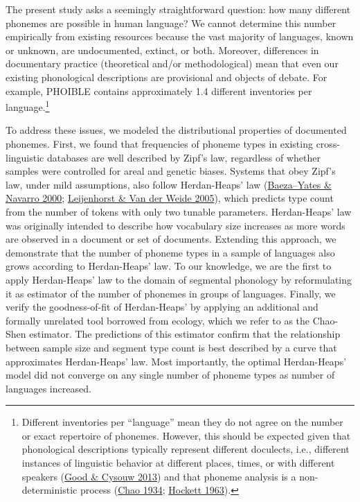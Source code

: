 \documentclass[
]{article}
\begin{document}
The present study asks a seemingly straightforward question: how many
different phonemes are possible in human language? We cannot determine
this number empirically from existing resources because the vast
majority of languages, known or unknown, are undocumented, extinct, or
both. Moreover, differences in documentary practice (theoretical and/or
methodological) mean that even our existing phonological descriptions
are provisional and objects of debate. For example, PHOIBLE contains
approximately 1.4 different inventories per language.\footnote{Different
  inventories per ``language'' mean they do not agree on the number or
  exact repertoire of phonemes. However, this should be expected given
  that phonological descriptions typically represent different
  doculects, i.e., different instances of linguistic behavior at
  different places, times, or with different speakers
  (\protect\hyperlink{ref-GoodCysouw2013}{Good \& Cysouw 2013}) and that
  phoneme analysis is a non-deterministic process
  (\protect\hyperlink{ref-Chao1934}{Chao 1934};
  \protect\hyperlink{ref-Hockett1963}{Hockett 1963}).}

To address these issues, we modeled the distributional properties of
documented phonemes. First, we found that frequencies of phoneme types
in existing cross-linguistic databases are well described by Zipf's law,
regardless of whether samples were controlled for areal and genetic
biases. Systems that obey Zipf's law, under mild assumptions, also
follow Herdan-Heaps' law
(\protect\hyperlink{ref-BaezaNavarro2000}{Baeza--Yates \& Navarro 2000};
\protect\hyperlink{ref-vanLeijenhorst2005}{Leijenhorst \& Van der Weide
2005}), which predicts type count from the number of tokens with only
two tunable parameters. Herdan-Heaps' law was originally intended to
describe how vocabulary size increases as more words are observed in a
document or set of documents. Extending this approach, we demonstrate
that the number of phoneme types in a sample of languages also grows
according to Herdan-Heaps' law. To our knowledge, we are the first to
apply Herdan-Heaps' law to the domain of segmental phonology by
reformulating it as estimator of the number of phonemes in groups of
languages. Finally, we verify the goodness-of-fit of Herdan-Heaps' by
applying an additional and formally unrelated tool borrowed from
ecology, which we refer to as the Chao-Shen estimator. The predictions
of this estimator confirm that the relationship between sample size and
segment type count is best described by a curve that approximates
Herdan-Heaps' law. Most importantly, the optimal Herdan-Heaps' model did
not converge on any single number of phoneme types as number of
languages increased.
\end{document}
